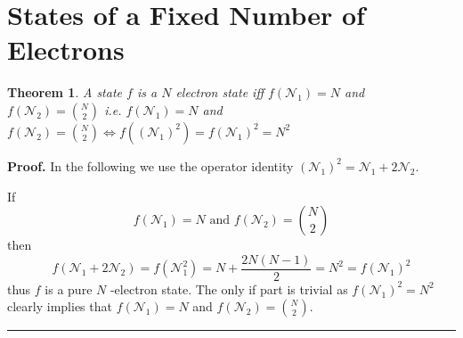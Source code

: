 \documentclass[aps,preprint,amsfonts,amssymb,showpacs,showkeys]{revtex4}%
\newtheorem{theorem}{Theorem}
\newenvironment{proof}[1][Proof]{\noindent\textbf{#1.} }{\ \rule{0.5em}{0.5em}}
\begin{document}
\section{States of a Fixed Number of Electrons \label{Number}}

\begin{theorem}
A state $f$ is a $N$ electron state iff $f\left(  \mathcal{N}_{1}\right)  =N$
and $f\left(  \mathcal{N}_{2}\right)  =\binom{N}{2}$ i.e. $f\left(
\mathcal{N}_{1}\right)  =N$ and $f\left(  \mathcal{N}_{2}\right)  =\binom
{N}{2}\Leftrightarrow f\left(  \left(  \mathcal{N}_{1}\right)  ^{2}\right)
=f\left(  \mathcal{N}_{1}\right)  ^{2}=N^{2}$
\end{theorem}

\begin{proof}
In the following we use the operator identity $\left(  \mathcal{N}_{1}\right)
^{2}=\mathcal{N}_{1}+2\mathcal{N}_{2}.$

If
\begin{equation}
f\left(  \mathcal{N}_{1}\right)  =N\text{ and }f\left(  \mathcal{N}%
_{2}\right)  =\binom{N}{2}%
\end{equation}
then%
\begin{equation}
f\left(  \mathcal{N}_{1}+2\mathcal{N}_{2}\right)  =f\left(  \mathcal{N}%
_{1}^{2}\right)  =N+\frac{2N\left(  N-1\right)  }{2}=N^{2}=f\left(
\mathcal{N}_{1}\right)  ^{2}%
\end{equation}
thus $f$ is a pure $N$ -electron state. The only if part is trivial as
$f\left(  \mathcal{N}_{1}\right)  ^{2}=N^{2}$ clearly implies that $f\left(
\mathcal{N}_{1}\right)  =N$ and $f\left(  \mathcal{N}_{2}\right)  =\binom
{N}{2}.$
\end{proof}



\end{document}
